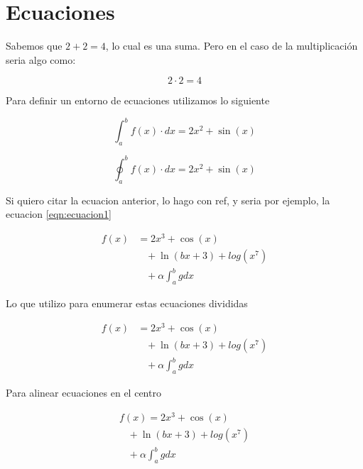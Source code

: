 \section{Ecuaciones}
Sabemos que $2+2=4$, lo cual es una suma. Pero en el caso de la multiplicación seria algo como:

$$ 2\cdot 2 = 4 $$

Para definir un entorno de ecuaciones utilizamos lo siguiente

\begin{equation}
    \int_{a}^{b} f(x)\cdot dx = 2x^2+\sin(x)
    \label{eqn:ecuacion1}
\end{equation}

\begin{equation*}
    \oint_{a}^{b} f(x)\cdot dx = 2x^2+\sin(x)
    \label{eqn:ecuacion2}
\end{equation*}

Si quiero citar la ecuacion anterior, lo hago con ref, y seria por ejemplo, la ecuacion \ref{eqn:ecuacion1}

\begin{align}
    f(x) &= 2x^3+\cos(x) \\
         & \hspace{10pt} + \ln(bx+3) +log(x^7) \\ 
         & \hspace{10pt} + \alpha\int_a^b g dx 
\end{align}

Lo que utilizo para enumerar estas ecuaciones divididas

\begin{equation}
    \begin{split}
        f(x) & = 2x^3+\cos(x) \\
             & \hspace{10pt} + \ln(bx+3) +log(x^7) \\ 
            & \hspace{10pt} + \alpha\int_a^b g dx 
    \end{split}
    \label{eqn:ecuacion3}
\end{equation}

Para alinear ecuaciones en el centro

\begin{gather} %
    f(x) = 2x^3+\cos(x) \\
         \hspace{10pt} + \ln(bx+3) +log(x^7) \\ 
         \hspace{10pt} + \alpha\int_a^b g dx 
\end{gather}

